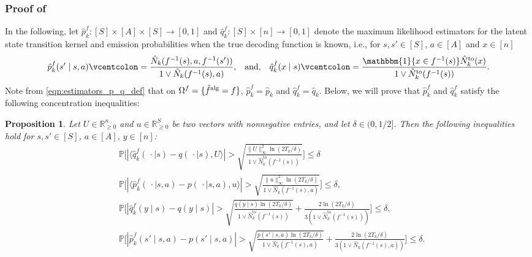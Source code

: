\documentclass[11pt]{article}
\newcommand{\eqdef}{\vcentcolon=}
\newcommand{\mbb}[1]{\mathbbm{#1}}
\newcommand{\mbbP}{\mathbb{P}}
\newcommand{\mbbR}{\mathbb{R}}
\newcommand{\alg}{\textnormal{alg}}
\newtheorem{proposition}[theorem]{Proposition}
\theoremstyle{definition}
\theoremstyle{definition}
\begin{document}
\subsubsection{Proof of \texorpdfstring{}{proposition}}
\label{sec:proof_of_transition_probability_event_bd}

In the following, let $\hat{p}_k^f:[S]\times [A]\times[S]\rightarrow [0,1]$ and $\hat{q}_k^f:[S]\times[n]\rightarrow [0,1]$ denote the maximum likelihood estimators for the latent state transition kernel and emission probabilities when the true decoding function is known, i.e., for $s,s'\in[S]$, $a\in[A]$ and $x\in[n]$
\begin{equation}
	\label{eqn:pfqfdef}
	\hat{p}_k^f(s'\mid s,a)
	\eqdef
	\frac{\hat{N}_k(f^{-1}(s),a,f^{-1}(s'))}{1\vee \hat{N}_k(f^{-1}(s),a)}
	,
	\!\quad \mathrm{and},\! \quad
	\hat{q}_k^f(x\mid s)
	\eqdef
	\frac{\mbb{1}\{x\in f^{-1}(s)\}\hat{N}^{\mathrm{to}}_k(x)}{1\vee \hat{N}^{\mathrm{to}}_k(f^{-1}(s))}
	.
\end{equation}
Note from \eqref{eqn:estimators_p_q_def} that on $\Omega^f=\{\hat{f}^{\alg}=f\}$, $\hat{p}_k^f=\hat{p}_k$ and $\hat{q}_k^f=\hat{q}_k$.
Below, we will prove that $\hat{p}_k^f$ and $\hat{q}_k^f$ satisfy the following concentration inequalities:
\begin{proposition}
	\label{prop:concentration_inequalities}
	Let $U\in\mbbR^n_{\geq0}$ and $u\in\mbbR^S_{\geq0}$ be two vectors with nonnegative entries, and let $\delta\in(0,1/2]$.
	Then the following inequalities hold for $s,s'\in[S]$, $a\in[A]$, $y\in[n]$:
	\begin{align}
		 &
		\mbbP\biggl[
		|\langle \hat{q}_k^f(\,\cdot \mid s)-q(\,\cdot \mid s), U\rangle|
		>
		\sqrt{\frac{\lVert U\rVert_{\infty}^2 \ln(2 T_k/\delta)}{1\vee \hat{N}^{\mathrm{to}}_k(f^{-1}(s))}}
		\biggr]
		\leq
		\delta
		\label{eqn:hoeffding_q}
		\\
		 &
		\mbbP\biggl[
			|\langle \hat{p}_k^f(\,\cdot \mid s,a)-p(\,\cdot \mid s,a), u\rangle|
			>
			\sqrt{\frac{\lVert u\rVert_{\infty}^2\ln(2 T_k/\delta)}{1\vee \hat{N}_k(f^{-1}(s),a)}}
			\biggr]
		\leq
		\delta
		,
		\label{eqn:hoeffding_p}
		\\
		 &
		\mbbP\biggl[
		|\hat{q}_k^f(y\mid s)-q(y\mid s)|
		>
		\sqrt{\frac{q(y\mid s) \ln(2T_k/\delta)}{1\vee \hat{N}^{\mathrm{to}}_k(f^{-1}(s))}}
		+
		\frac{2\ln(2T_k/\delta)}{3(1\vee\hat{N}^{\mathrm{to}}_k(f^{-1}(s)))}
		\biggr]
		\leq
		\delta
		,
		\label{eqn:bernstein_q}
		\\
		 &
		\mbbP\biggl[
			| \hat{p}_k^f(s'\mid s,a)-p(s'\mid s,a)|
			>
			\sqrt{\frac{p(s'\mid s,a)\ln(2T_k/\delta)}{1\vee \hat{N}_k(f^{-1}(s),a)}}
			+
			\frac{2\ln(2T_k/\delta)}{3(1\vee\hat{N}_k(f^{-1}(s),a))}
			\biggr]
		\leq
		\delta
		.
		\label{eqn:bernstein_p}
	\end{align}
\end{proposition}
\end{document}
